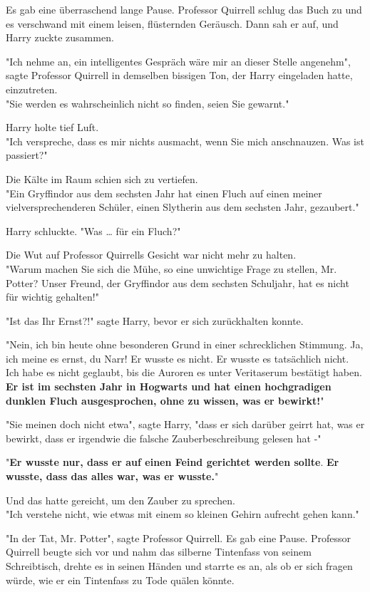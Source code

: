 {Es gab eine überraschend lange Pause. Professor Quirrell schlug das Buch zu und es verschwand mit einem leisen, flüsternden Geräusch. Dann sah er auf, und Harry zuckte zusammen.

"Ich nehme an, ein intelligentes Gespräch wäre mir an dieser Stelle angenehm", sagte Professor Quirrell in demselben bissigen Ton, der Harry eingeladen hatte, einzutreten.\\ "Sie werden es wahrscheinlich nicht so finden, seien Sie gewarnt."

Harry holte tief Luft.\\ "Ich verspreche, dass es mir nichts ausmacht, wenn Sie mich anschnauzen. Was ist passiert?"

Die Kälte im Raum schien sich zu vertiefen.\\ "Ein Gryffindor aus dem sechsten Jahr hat einen Fluch auf einen meiner vielversprechenderen Schüler, einen Slytherin aus dem sechsten Jahr, gezaubert."

Harry schluckte. "Was … für ein Fluch?"

Die Wut auf Professor Quirrells Gesicht war nicht mehr zu halten.\\ "Warum machen Sie sich die Mühe, so eine unwichtige Frage zu stellen, Mr. Potter? Unser Freund, der Gryffindor aus dem sechsten Schuljahr, hat es nicht für wichtig gehalten!"

"Ist das Ihr Ernst?!" sagte Harry, bevor er sich zurückhalten konnte.

"Nein, ich bin heute ohne besonderen Grund in einer schrecklichen Stimmung. Ja, ich meine es ernst, du Narr! Er wusste es nicht. Er wusste es tatsächlich nicht. Ich habe es nicht geglaubt, bis die Auroren es unter Veritaserum bestätigt haben.\\ \textbf{Er ist im sechsten Jahr in Hogwarts und hat einen hochgradigen dunklen Fluch ausgesprochen, ohne zu wissen, was er bewirkt!}"

"Sie meinen doch nicht etwa", sagte Harry, "dass er sich darüber geirrt hat, was er bewirkt, dass er irgendwie die falsche Zauberbeschreibung gelesen hat -"

"\textbf{Er wusste nur, dass er auf einen Feind gerichtet werden sollte}. \textbf{Er wusste, dass das alles war, was er wusste.}"

Und das hatte gereicht, um den Zauber zu sprechen.\\ "Ich verstehe nicht, wie etwas mit einem so kleinen Gehirn aufrecht gehen kann."

"In der Tat, Mr. Potter", sagte Professor Quirrell. Es gab eine Pause. Professor Quirrell beugte sich vor und nahm das silberne Tintenfass von seinem Schreibtisch, drehte es in seinen Händen und starrte es an, als ob er sich fragen würde, wie er ein Tintenfass zu Tode quälen könnte.

}

